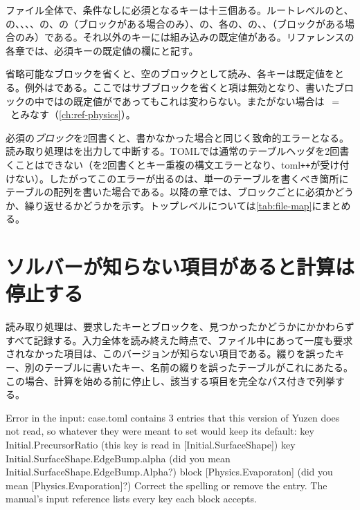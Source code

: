 ファイル全体で、条件なしに必須となるキーは十三個ある。ルートレベルのと、の、、、、の、の（ブロックがある場合のみ）、の、各の、の、、（ブロックがある場合のみ）である。それ以外のキーには組み込みの既定値がある。リファレンスの各章では、必須キーの既定値の欄に\reqd{}と記す。

省略可能なブロックを省くと、空のブロックとして読み、各キーは既定値をとる。例外はである。ここではサブブロックを省くと項は無効となり、書いたブロックの中ではの既定値がであってもこれは変わらない。またがない場合は~$=$~とみなす（\cref{ch:ref-physics}）。

必須の\emph{ブロック}を2回書くと、書かなかった場合と同じく致命的エラーとなる。読み取り処理はを出力して中断する。TOMLでは通常のテーブルヘッダを2回書くことはできない（\code{[Grid]}を2回書くとキー重複の構文エラーとなり、toml\texttt{++}が受け付けない）。したがってこのエラーが出るのは、単一のテーブルを書くべき箇所にテーブルの配列\code{[[Grid]]}を書いた場合である。以降の章では、ブロックごとに必須かどうか、繰り返せるかどうかを示す。トップレベルについては\cref{tab:file-map}にまとめる。

\section{ソルバーが知らない項目があると計算は停止する}
\label{sec:inputformat:unknown}

読み取り処理は、要求したキーとブロックを、見つかったかどうかにかかわらずすべて記録する。入力全体を読み終えた時点で、ファイル中にあって一度も要求されなかった項目は、このバージョンが知らない項目である。綴りを誤ったキー、別のテーブルに書いたキー、名前の綴りを誤ったテーブルがこれにあたる。この場合、計算を始める前に停止し、該当する項目を完全なパス付きで列挙する。

\begin{plain}
Error in the input: case.toml contains 3 entries that this version of Yuzen
does not read, so whatever they were meant to set would keep its default:
  key   Initial.PrecursorRatio   (this key is read in [Initial.SurfaceShape])
  key   Initial.SurfaceShape.EdgeBump.alpha   (did you mean Initial.SurfaceShape.EdgeBump.Alpha?)
  block [Physics.Evaporaton]   (did you mean [Physics.Evaporation]?)
Correct the spelling or remove the entry. The manual's input reference lists
every key each block accepts.
\end{plain}

